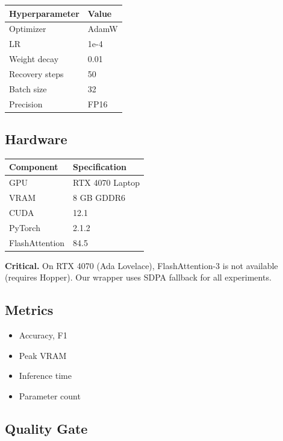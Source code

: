\begin{table}[H]
\centering
\small
\begin{tabular}{ll}
\toprule
\textbf{Hyperparameter} & \textbf{Value} \\
\midrule
Optimizer & AdamW \\
LR & 1e-4 \\
Weight decay & 0.01 \\
Recovery steps & 50 \\
Batch size & 32 \\
Precision & FP16 \\
\bottomrule
\end{tabular}
\end{table}

\subsection{Hardware}

\begin{table}[H]
\centering
\small
\begin{tabular}{ll}
\toprule
\textbf{Component} & \textbf{Specification} \\
\midrule
GPU & RTX 4070 Laptop \\
VRAM & 8 GB GDDR6 \\
CUDA & 12.1 \\
PyTorch & 2.1.2 \\
FlashAttention & 84.5 \\
\bottomrule
\end{tabular}
\end{table}

\textbf{Critical.} On RTX 4070 (Ada Lovelace), FlashAttention-3 is not available 
(requires Hopper). Our wrapper uses SDPA fallback for all experiments.

\subsection{Metrics}

\begin{itemize}
\item Accuracy, F1
\item Peak VRAM
\item Inference time
\item Parameter count

\end{itemize}
\subsection{Quality Gate}

